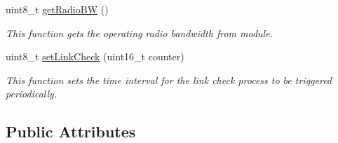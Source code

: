 \begin{DoxyCompactItemize}
uint8\+\_\+t \hyperlink{class_wasp_lo_ra_w_a_n_aacdadecb332215bd7c74ada41a5816ff}{get\+Radio\+BW} ()
\begin{DoxyCompactList}\small\item\em This function gets the operating radio bandwidth from module. \end{DoxyCompactList}\item 
uint8\+\_\+t \hyperlink{class_wasp_lo_ra_w_a_n_a77395926a42b1ebffc0b0ff4997743b4}{set\+Link\+Check} (uint16\+\_\+t counter)
\begin{DoxyCompactList}\small\item\em This function sets the time interval for the link check process to be triggered periodically. \end{DoxyCompactList}\end{DoxyCompactItemize}
\subsection*{Public Attributes}
